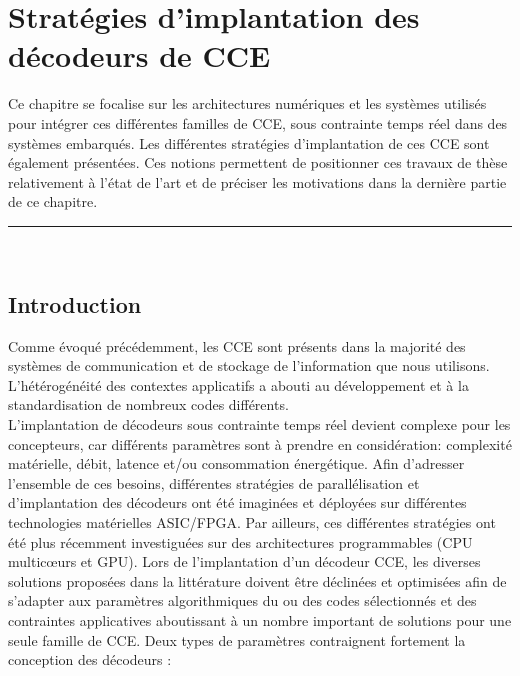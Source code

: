 \documentclass[../main.tex]{subfiles}
\begin{document}
%
%
%
%
\chapter{Stratégies d'implantation des décodeurs de CCE} 
\label{chapter:2_2}
%
%
%
%
%

Ce chapitre se focalise sur les architectures numériques et les systèmes utilisés pour intégrer ces différentes familles de CCE, sous contrainte temps réel dans des systèmes embarqués.
Les différentes stratégies d’implantation de ces CCE sont également présentées. Ces notions permettent de positionner ces travaux de thèse relativement à l'état de l'art et de préciser les motivations dans la dernière partie de ce chapitre.

%
%
%
%
%
%
%
\etocsettocstyle{
    { \large \hspace{-1.5 em} \textbf{} \hfill}
    \vspace{-2.5 em}\\\par\noindent\rule{\linewidth}{1 pt}\vspace{-.2 em}
    }
{\par\noindent\rule{\linewidth}{1 pt}\\}
\localtableofcontents

%
% 
% 
% 
% 
\section{Introduction}
% 
% 
% 
% 

Comme évoqué précédemment, les CCE sont présents dans la majorité des systèmes de communication et de stockage de l’information que nous utilisons. L'hétérogénéité des contextes applicatifs a abouti au développement et à la standardisation de nombreux codes différents.\\
L’implantation de décodeurs sous contrainte temps réel devient complexe pour les concepteurs, car différents paramètres sont à prendre en considération: complexité matérielle, débit, latence et/ou consommation énergétique. Afin d'adresser l’ensemble de ces besoins, différentes stratégies de parallélisation et d’implantation des décodeurs ont été imaginées et déployées sur différentes technologies matérielles ASIC/FPGA. Par ailleurs, ces différentes stratégies ont été plus récemment investiguées sur des architectures programmables (CPU multicœurs et GPU). Lors de l’implantation d’un décodeur CCE, les diverses solutions proposées dans la littérature doivent être déclinées et optimisées afin de s’adapter aux paramètres algorithmiques du ou des codes sélectionnés et des contraintes applicatives aboutissant à un nombre important de solutions pour une seule famille de CCE. Deux types de paramètres contraignent fortement la conception des décodeurs :
\end{document}
